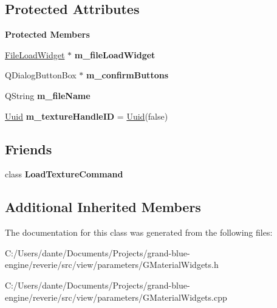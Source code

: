 \subsection*{Protected Attributes}
\begin{Indent}\textbf{ Protected Members}\par
\begin{DoxyCompactItemize}
\item 
\mbox{\label{classrev_1_1_view_1_1_load_texture_widget_a867a17cc5da07c2d38689ba23cc5e4e4}} 
\mbox{\hyperlink{classrev_1_1_view_1_1_file_load_widget}{File\+Load\+Widget}} $\ast$ {\bfseries m\+\_\+file\+Load\+Widget}
\item 
\mbox{\label{classrev_1_1_view_1_1_load_texture_widget_acf97a7d479be62b2c8aacdf070c1f263}} 
Q\+Dialog\+Button\+Box $\ast$ {\bfseries m\+\_\+confirm\+Buttons}
\item 
\mbox{\label{classrev_1_1_view_1_1_load_texture_widget_a681639ad23751f01a3dd3a3fbbc1bbb2}} 
Q\+String {\bfseries m\+\_\+file\+Name}
\item 
\mbox{\label{classrev_1_1_view_1_1_load_texture_widget_a884585f42c72ec5e7bd07961eaa5a6c4}} 
\mbox{\hyperlink{classrev_1_1_uuid}{Uuid}} {\bfseries m\+\_\+texture\+Handle\+ID} = \mbox{\hyperlink{classrev_1_1_uuid}{Uuid}}(false)
\end{DoxyCompactItemize}
\end{Indent}
\subsection*{Friends}
\begin{DoxyCompactItemize}
\item 
\mbox{\label{classrev_1_1_view_1_1_load_texture_widget_a0abc1d1f69d722bc0c368aae13e64a2f}} 
class {\bfseries Load\+Texture\+Command}
\end{DoxyCompactItemize}
\subsection*{Additional Inherited Members}


The documentation for this class was generated from the following files\+:\begin{DoxyCompactItemize}
\item 
C\+:/\+Users/dante/\+Documents/\+Projects/grand-\/blue-\/engine/reverie/src/view/parameters/G\+Material\+Widgets.\+h\item 
C\+:/\+Users/dante/\+Documents/\+Projects/grand-\/blue-\/engine/reverie/src/view/parameters/G\+Material\+Widgets.\+cpp\end{DoxyCompactItemize}
